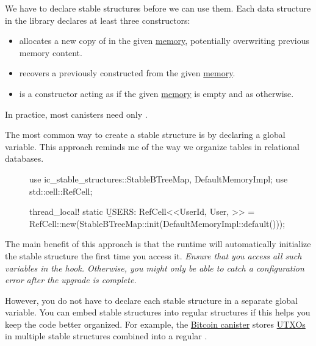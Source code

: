 \documentclass{article}
\begin{document}
We have to declare stable structures before we can use them.
Each data structure  in the library declares at least three constructors:
\begin{itemize}
  \item{} allocates a new copy of  in the given \href{#memory}{memory}, potentially overwriting previous memory content.
  \item{} recovers a previously constructed  from the given \href{#memory}{memory}.
  \item{} is a \href{https://en.wikipedia.org/wiki/DWIM}{} constructor acting as  if the given \href{#memory}{memory} is empty and as  otherwise.
\end{itemize}

In practice, most canisters need only .

The most common way to create a stable structure is by declaring a global variable.
This approach reminds me of the way we organize tables in relational databases.

\begin{figure}
\begin{code}[rust]
use ic_stable_structures::{StableBTreeMap, DefaultMemoryImpl};
use std::cell::RefCell;

thread_local! {
  static \b{USERS}: RefCell<\href{#stable-btree}{}<UserId, User, \href{#default-memory-impl}{}>> =
    RefCell::new(StableBTreeMap::init(DefaultMemoryImpl::default()));
}
\end{code}
\end{figure}

The main benefit of this approach is that the runtime will automatically initialize the stable structure the first time you access it.
\em{Ensure that you access all such variables in the  hook.}
Otherwise, you might only be able to catch a configuration error after the upgrade is complete.

However, you do not have to declare each stable structure in a separate global variable.
You can embed stable structures into regular structures if this helps you keep the code better organized.
For example, the \href{https://github.com/dfinity/bitcoin-canister}{Bitcoin canister} stores \href{https://github.com/dfinity/bitcoin-canister/blob/9242d5f9a784ac115c2042fd09705dd9321ff7b7/canister/src/utxo_set/utxos.rs#L51}{UTXOs} in multiple stable structures combined into a regular .
\end{document}

